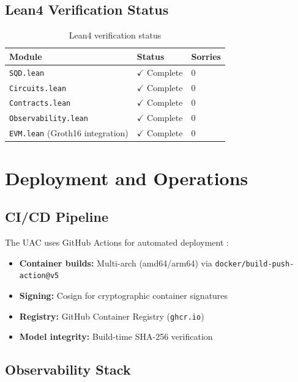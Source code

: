 \documentclass[11pt,a4paper]{article}
\theoremstyle{plain}
\begin{document}
\subsection{Lean4 Verification Status}

\begin{table}[h]
\centering
\begin{tabular}{lll}
\toprule
\textbf{Module} & \textbf{Status} & \textbf{Sorries} \\
\midrule
\texttt{SQD.lean} & $\checkmark$ Complete & 0 \\
\texttt{Circuits.lean} & $\checkmark$ Complete & 0 \\
\texttt{Contracts.lean} & $\checkmark$ Complete & 0 \\
\texttt{Observability.lean} & $\checkmark$ Complete & 0 \\
\texttt{EVM.lean} (Groth16 integration) & $\checkmark$ Complete & 0 \\
\bottomrule
\end{tabular}
\caption{Lean4 verification status}
\label{tab:leanStatus}
\end{table}

\section{Deployment and Operations}

\subsection{CI/CD Pipeline}

The UAC uses GitHub Actions for automated deployment \cite{cosign}:

\begin{itemize}
    \item \textbf{Container builds:} Multi-arch (amd64/arm64) via \texttt{docker/build-push-action@v5}
    \item \textbf{Signing:} Cosign for cryptographic container signatures
    \item \textbf{Registry:} GitHub Container Registry (\texttt{ghcr.io})
    \item \textbf{Model integrity:} Build-time SHA-256 verification
\end{itemize}

\subsection{Observability Stack}
\end{document}
